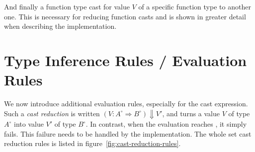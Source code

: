And finally a function type cast for value $V$ of a specific function type to another one. This is necessary for reducing function casts and is shown in greater detail when describing the implementation.

\section{Type Inference Rules / Evaluation Rules}\label{sec:ccldlc-inference-rules}

We now introduce additional evaluation rules, especially for the cast expression. Such a \emph{cast reduction} is written $(V : A^\circ \Rightarrow B^\circ) \Downarrow V'$, and turns a value $V$ of type $A^\circ$ into value $V'$ of type $B^\circ$. In contrast, when the evaluation reaches \blame, it simply fails. This failure needs to be handled by the implementation. The whole set cast reduction rules is listed in figure~\ref{fig:cast-reduction-rules}.

